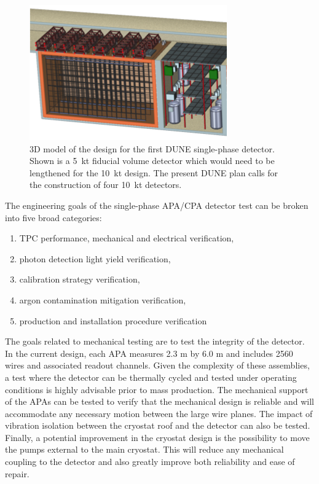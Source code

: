 \begin{figure}[!htb]
\centering
\begin{minipage}[b]{1.0\textwidth}
\begin{center}
\includegraphics[width=.75\textwidth]{figures/fardet-3D.png}
\end{center}
\end{minipage}
\caption{\small 3D model of the design for the first DUNE single-phase detector. Shown is a 5~kt fiducial volume detector which would need to be lengthened for the 10~kt design. The present DUNE plan calls for the construction of four 10~kt detectors. }
\label{fig:fardet-overview} 
\end{figure}

The engineering goals of the single-phase APA/CPA detector test can be broken into five broad categories: 
\begin{enumerate}
	\item TPC performance, mechanical and electrical verification, 
	\item photon detection light yield verification,
	\item calibration strategy verification,
	\item argon contamination mitigation verification, 
	\item production and installation procedure verification
\end{enumerate}

	 The goals related to mechanical testing are to test the integrity of the detector. In the current design, each APA measures 2.3 m by 6.0 m and includes 2560 wires and associated readout channels. Given the complexity of these assemblies, a test where the detector can be thermally cycled and tested under operating conditions is highly advisable prior to mass production. The mechanical support of the APAs can be tested to verify that the mechanical design is reliable and will accommodate any necessary motion between the large wire planes. The impact of vibration isolation between the cryostat roof and the detector can also be tested. Finally, a potential improvement in the cryostat design is the possibility to move the pumps external to the main cryostat. This will reduce any mechanical coupling to the detector and also greatly improve both reliability and ease of repair.

